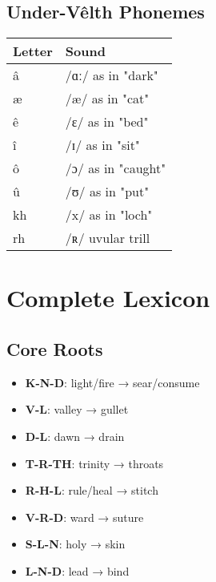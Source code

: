 \documentclass[11pt,a4paper,twoside]{book}
\begin{document}
\section{Under-Vêlth Phonemes}

\begin{tabular}{ll}
\textbf{Letter} & \textbf{Sound} \\
\hline
â & /ɑː/ as in "dark" \\
æ & /æ/ as in "cat" \\
ê & /ɛ/ as in "bed" \\
î & /ɪ/ as in "sit" \\
ô & /ɔ/ as in "caught" \\
û & /ʊ/ as in "put" \\
kh & /x/ as in "loch" \\
rh & /ʀ/ uvular trill \\
\end{tabular}

\chapter{Complete Lexicon}

\section{Core Roots}

\begin{itemize}
    \item \textbf{K-N-D}: light/fire → sear/consume
    \item \textbf{V-L}: valley → gullet
    \item \textbf{D-L}: dawn → drain
    \item \textbf{T-R-TH}: trinity → throats
    \item \textbf{R-H-L}: rule/heal → stitch
    \item \textbf{V-R-D}: ward → suture
    \item \textbf{S-L-N}: holy → skin
    \item \textbf{L-N-D}: lead → bind
\end{itemize}
\end{document}
